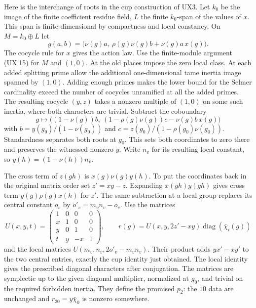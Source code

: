Here is the interchange of roots in the cup construction of UX3.
Let $k_0$ be the image of the finite coefficient residue field, $L$ the
finite $k_0$-span of the values of $x$. This span is finite-dimensional
by compactness and local constancy. On $M=k_0\oplus L$ let
\[
 g(a,b)=\bigl(\nu(g)a,\ \rho(g)\nu(g)b+\nu(g)a\,x(g)\bigr).
\]
The cocycle rule for $x$ gives the action law. Use the finite-module
argument (UX.15) for $M$ and $(1,0)$. At the old places impose the
zero local class. At each added splitting prime allow the additional
one-dimensional tame inertia image spanned by $(1,0)$. Adding enough
primes makes the lower bound for the Selmer cardinality exceed the
number of cocycles unramified at all the added primes. The resulting
cocycle $(y,z)$ takes a nonzero multiple of $(1,0)$ on some such
inertia, where both characters are trivial. Subtract the coboundary
\[
 g\longmapsto\bigl((1-\nu(g))b,\
 (1-\rho(g)\nu(g))c-\nu(g)b\,x(g)\bigr)
\]
with $b=y(g_0)/(1-\nu(g_0))$ and
$c=z(g_0)/(1-\rho(g_0)\nu(g_0))$. Standardness separates both
roots at $g_0$. This sets both coordinates to zero there and preserves
the witnessed nonzero $y$. Write $n_v$ for its resulting local
constant, so $y(h)=(1-\nu(h))n_v$.

The cross term of $z(gh)$ is $x(g)\nu(g)y(h)$. To put the coordinates
back in the original matrix order set $z'=xy-z$. Expanding
$x(gh)y(gh)$ gives cross term $y(g)\rho(g)x(h)$ for $z'$.
The same subtraction at a local group replaces its central constant
$o_v$ by $o'_v=m_v n_v-o_v$. Use the matrices
\[
 U(x,y,t)=\begin{pmatrix}1&0&0&0\\ x&1&0&0\\ y&0&1&0\\ t&y&-x&1\end{pmatrix},
 \qquad r(g)=U(x,y,2z'-xy)\operatorname{diag}(\bar\chi_i(g))
\]
and the local matrices $U(m_v,n_v,2o'_v-m_vn_v)$. Their product
adds $yx'-xy'$ to the two central entries, exactly the cup identity
just obtained. The local identity gives the prescribed diagonal
characters after conjugation. The matrices are symplectic up to the
given diagonal multiplier, normalized at $g_0$, and trivial on the
required forbidden inertia. They define the promised $p_2$: the
$10$ data are unchanged and $r_{20}=y\bar\chi_0$ is nonzero somewhere.

